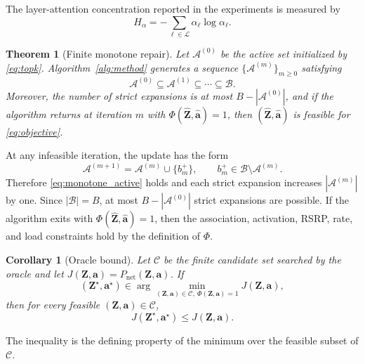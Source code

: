 \documentclass[journal]{IEEEtran}
\newtheorem{theorem}{Theorem}
\newtheorem{corollary}{Corollary}
\begin{document}
\noindent The layer-attention concentration reported in the experiments is
measured by
\begin{equation}
    H_{\alpha}=-\sum_{\ell\in\mathcal{L}}\alpha_{\ell}\log\alpha_{\ell}.
    \label{eq:attention_entropy}
\end{equation}

\begin{theorem}[Finite monotone repair]
Let $\mathcal{A}^{(0)}$ be the active set initialized by
\eqref{eq:topk}. Algorithm~\ref{alg:method} generates a sequence
$\{\mathcal{A}^{(m)}\}_{m\geq0}$ satisfying
\begin{equation}
    \mathcal{A}^{(0)}\subseteq\mathcal{A}^{(1)}
    \subseteq\cdots\subseteq\mathcal{B}.
    \label{eq:monotone_active}
\end{equation}
Moreover, the number of strict expansions is at most $B-|\mathcal{A}^{(0)}|$,
and if the algorithm returns at iteration $m$ with
$\Phi(\widehat{\mathbf{Z}},\widehat{\mathbf{a}})=1$, then
$(\widehat{\mathbf{Z}},\widehat{\mathbf{a}})$ is feasible for
\eqref{eq:objective}.
\end{theorem}
\begin{IEEEproof}
At any infeasible iteration, the update has the form
\begin{equation}
    \mathcal{A}^{(m+1)}
    =
    \mathcal{A}^{(m)}\cup\{b^{+}_m\},\qquad
    b^{+}_m\in\mathcal{B}\setminus\mathcal{A}^{(m)}.
\end{equation}
Therefore \eqref{eq:monotone_active} holds and each strict expansion increases
$|\mathcal{A}^{(m)}|$ by one. Since $|\mathcal{B}|=B$, at most
$B-|\mathcal{A}^{(0)}|$ strict expansions are possible. If the algorithm exits
with $\Phi(\widehat{\mathbf{Z}},\widehat{\mathbf{a}})=1$, then the association,
activation, RSRP, rate, and load constraints hold by the definition of
$\Phi$.
\end{IEEEproof}

\begin{corollary}[Oracle bound]
Let $\mathcal{C}$ be the finite candidate set searched by the oracle and let
$J(\mathbf{Z},\mathbf{a})=P_{\mathrm{net}}(\mathbf{Z},\mathbf{a})$. If
\begin{equation}
    (\mathbf{Z}^{\star},\mathbf{a}^{\star})
    \in\arg\min_{(\mathbf{Z},\mathbf{a})\in\mathcal{C},\ \Phi(\mathbf{Z},\mathbf{a})=1}
    J(\mathbf{Z},\mathbf{a}),
\end{equation}
then for every feasible
$(\mathbf{Z},\mathbf{a})\in\mathcal{C}$,
\begin{equation}
    J(\mathbf{Z}^{\star},\mathbf{a}^{\star})
    \leq J(\mathbf{Z},\mathbf{a}).
\end{equation}
\end{corollary}
\begin{IEEEproof}
The inequality is the defining property of the minimum over the feasible subset
of $\mathcal{C}$.
\end{IEEEproof}
\end{document}
